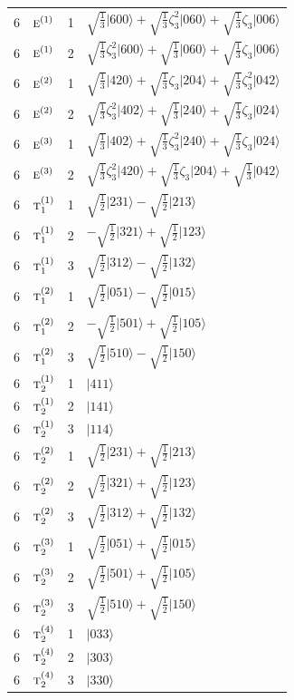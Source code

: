 \documentclass[11pt]{article}
\newcommand{\irr}[1]{\text{\normalfont\scshape #1}}
\newcommand{\rootunity}[1]{\zeta_{#1}}
\newcommand{\occ}[1]{\lvert #1\rangle}
\begin{document}
\begin{longtable}{c l c p{}}
6 & $\irr{e}^{(1)}$ & 1 & $\sqrt{\tfrac{1}{3}}\occ{600}+\sqrt{\tfrac{1}{3}}\rootunity{3}^{2}\occ{060}+\sqrt{\tfrac{1}{3}}\rootunity{3}\occ{006}$\\
6 & $\irr{e}^{(1)}$ & 2 & $\sqrt{\tfrac{1}{3}}\rootunity{3}^{2}\occ{600}+\sqrt{\tfrac{1}{3}}\occ{060}+\sqrt{\tfrac{1}{3}}\rootunity{3}\occ{006}$\\
6 & $\irr{e}^{(2)}$ & 1 & $\sqrt{\tfrac{1}{3}}\occ{420}+\sqrt{\tfrac{1}{3}}\rootunity{3}\occ{204}+\sqrt{\tfrac{1}{3}}\rootunity{3}^{2}\occ{042}$\\
6 & $\irr{e}^{(2)}$ & 2 & $\sqrt{\tfrac{1}{3}}\rootunity{3}^{2}\occ{402}+\sqrt{\tfrac{1}{3}}\occ{240}+\sqrt{\tfrac{1}{3}}\rootunity{3}\occ{024}$\\
6 & $\irr{e}^{(3)}$ & 1 & $\sqrt{\tfrac{1}{3}}\occ{402}+\sqrt{\tfrac{1}{3}}\rootunity{3}^{2}\occ{240}+\sqrt{\tfrac{1}{3}}\rootunity{3}\occ{024}$\\
6 & $\irr{e}^{(3)}$ & 2 & $\sqrt{\tfrac{1}{3}}\rootunity{3}^{2}\occ{420}+\sqrt{\tfrac{1}{3}}\rootunity{3}\occ{204}+\sqrt{\tfrac{1}{3}}\occ{042}$\\
6 & $\irr{t}_{1}^{(1)}$ & 1 & $\sqrt{\tfrac{1}{2}}\occ{231}-\sqrt{\tfrac{1}{2}}\occ{213}$\\
6 & $\irr{t}_{1}^{(1)}$ & 2 & $-\sqrt{\tfrac{1}{2}}\occ{321}+\sqrt{\tfrac{1}{2}}\occ{123}$\\
6 & $\irr{t}_{1}^{(1)}$ & 3 & $\sqrt{\tfrac{1}{2}}\occ{312}-\sqrt{\tfrac{1}{2}}\occ{132}$\\
6 & $\irr{t}_{1}^{(2)}$ & 1 & $\sqrt{\tfrac{1}{2}}\occ{051}-\sqrt{\tfrac{1}{2}}\occ{015}$\\
6 & $\irr{t}_{1}^{(2)}$ & 2 & $-\sqrt{\tfrac{1}{2}}\occ{501}+\sqrt{\tfrac{1}{2}}\occ{105}$\\
6 & $\irr{t}_{1}^{(2)}$ & 3 & $\sqrt{\tfrac{1}{2}}\occ{510}-\sqrt{\tfrac{1}{2}}\occ{150}$\\
6 & $\irr{t}_{2}^{(1)}$ & 1 & $\occ{411}$\\
6 & $\irr{t}_{2}^{(1)}$ & 2 & $\occ{141}$\\
6 & $\irr{t}_{2}^{(1)}$ & 3 & $\occ{114}$\\
6 & $\irr{t}_{2}^{(2)}$ & 1 & $\sqrt{\tfrac{1}{2}}\occ{231}+\sqrt{\tfrac{1}{2}}\occ{213}$\\
6 & $\irr{t}_{2}^{(2)}$ & 2 & $\sqrt{\tfrac{1}{2}}\occ{321}+\sqrt{\tfrac{1}{2}}\occ{123}$\\
6 & $\irr{t}_{2}^{(2)}$ & 3 & $\sqrt{\tfrac{1}{2}}\occ{312}+\sqrt{\tfrac{1}{2}}\occ{132}$\\
6 & $\irr{t}_{2}^{(3)}$ & 1 & $\sqrt{\tfrac{1}{2}}\occ{051}+\sqrt{\tfrac{1}{2}}\occ{015}$\\
6 & $\irr{t}_{2}^{(3)}$ & 2 & $\sqrt{\tfrac{1}{2}}\occ{501}+\sqrt{\tfrac{1}{2}}\occ{105}$\\
6 & $\irr{t}_{2}^{(3)}$ & 3 & $\sqrt{\tfrac{1}{2}}\occ{510}+\sqrt{\tfrac{1}{2}}\occ{150}$\\
6 & $\irr{t}_{2}^{(4)}$ & 1 & $\occ{033}$\\
6 & $\irr{t}_{2}^{(4)}$ & 2 & $\occ{303}$\\
6 & $\irr{t}_{2}^{(4)}$ & 3 & $\occ{330}$\\
\hline
\end{longtable}
\end{document}
